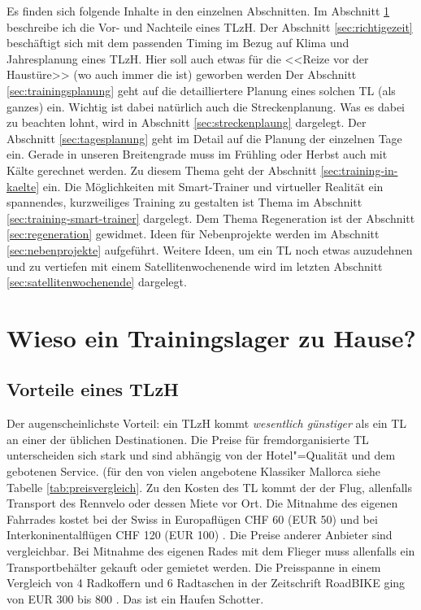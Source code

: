 \documentclass[a4paper,DIV13,BCOR0cm,draft=TRUE]{scrartcl}
\newcommand{\rv}{Rennvelo}
\newcommand{\tlzh}{TLzH}
\begin{document}
Es finden sich folgende Inhalte in den einzelnen Abschnitten.
Im Abschnitt \ref{sec:wiesozuhause} beschreibe ich die Vor- und Nachteile eines \tlzh{}.
Der Abschnitt \ref{sec:richtigezeit} beschäftigt sich mit dem passenden Timing im Bezug
auf Klima und Jahresplanung eines \tlzh{}.
Hier soll auch etwas für die <<Reize vor der Haustüre>> (wo auch immer die ist) geworben werden
Der Abschnitt \ref{sec:trainingsplanung} geht auf die detailliertere Planung eines solchen TL (als ganzes) ein.
Wichtig ist dabei natürlich auch die Streckenplanung. Was es dabei zu beachten lohnt, wird in Abschnitt
\ref{sec:streckenplaung} dargelegt.
Der Abschnitt \ref{sec:tagesplanung} geht im Detail auf die Planung der einzelnen Tage ein.
Gerade in unseren Breitengrade muss im Frühling oder Herbst auch mit Kälte gerechnet werden.
Zu diesem Thema geht der Abschnitt \ref{sec:training-in-kaelte} ein.
Die Möglichkeiten mit Smart-Trainer und virtueller Realität ein spannendes, kurzweiliges Training
zu gestalten ist Thema im Abschnitt \ref{sec:training-smart-trainer} dargelegt.
Dem Thema Regeneration ist der Abschnitt \ref{sec:regeneration} gewidmet.
Ideen für Nebenprojekte werden im Abschnitt \ref{sec:nebenprojekte} aufgeführt.
Weitere Ideen, um ein TL noch etwas auzudehnen und zu vertiefen mit einem Satellitenwochenende wird
im letzten Abschnitt \ref{sec:satellitenwochenende} dargelegt.

\section{Wieso ein Trainingslager zu Hause?}
\label{sec:wiesozuhause}

\subsection{Vorteile eines \tlzh}

Der augenscheinlichste Vorteil:
ein \tlzh{} kommt \emph{wesentlich günstiger} als ein TL an einer der üblichen Destinationen.
Die Preise für fremdorganisierte TL unterscheiden sich stark
und sind abhängig von der Hotel"=Qualität und dem gebotenen Service.
(für den von vielen angebotene Klassiker Mallorca siehe Tabelle \ref{tab:preisvergleich}.
Zu den Kosten des TL kommt der der Flug, allenfalls Transport des \rv{} oder dessen Miete vor Ort.
Die Mitnahme des eigenen Fahrrades kostet bei der Swiss in Europaflügen CHF 60 (EUR 50) und bei Interkoninentalflügen CHF 120 (EUR 100)
\cite{swiss2016fahrradmitnahme}. Die Preise anderer Anbieter sind vergleichbar.
Bei Mitnahme des eigenen Rades mit dem Flieger muss allenfalls ein Transportbehälter gekauft oder gemietet werden.
Die Preisspanne in einem Vergleich von 4 Radkoffern und 6 Radtaschen in der Zeitschrift RoadBIKE ging von EUR 300 bis 800
\cite{Brunker2015radkoffer}.
Das ist ein Haufen Schotter.
\end{document}
